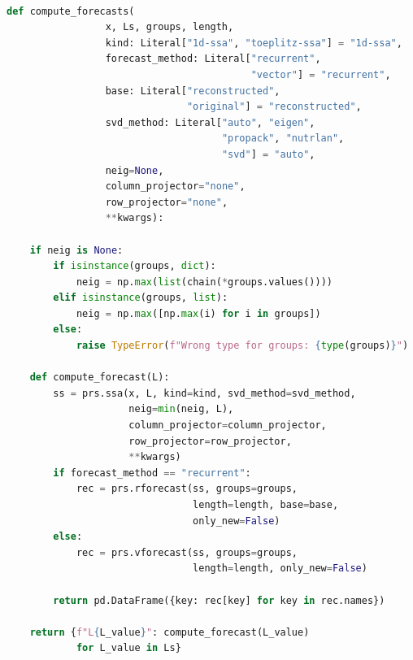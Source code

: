 \documentclass[specialist,
			   substylefile = spbu_report.rtx,
			   subf,href,colorlinks=true, 12pt]{disser}
\begin{document}
\begin{lstlisting}[language=Python, caption=Функции для подсчета значений прогноза временного ряда при тестировании.]

def compute_forecasts(
                 x, Ls, groups, length,
                 kind: Literal["1d-ssa", "toeplitz-ssa"] = "1d-ssa",
                 forecast_method: Literal["recurrent", 
                                          "vector"] = "recurrent",
                 base: Literal["reconstructed", 
                               "original"] = "reconstructed",
                 svd_method: Literal["auto", "eigen", 
                                     "propack", "nutrlan",
                                     "svd"] = "auto",
                 neig=None,
                 column_projector="none",
                 row_projector="none",
                 **kwargs):
                 
    if neig is None:
        if isinstance(groups, dict):
            neig = np.max(list(chain(*groups.values())))
        elif isinstance(groups, list):
            neig = np.max([np.max(i) for i in groups])
        else:
            raise TypeError(f"Wrong type for groups: {type(groups)}")

    def compute_forecast(L):
        ss = prs.ssa(x, L, kind=kind, svd_method=svd_method,
                     neig=min(neig, L),
                     column_projector=column_projector,
                     row_projector=row_projector,
                     **kwargs)
        if forecast_method == "recurrent":
            rec = prs.rforecast(ss, groups=groups,
                                length=length, base=base,
                                only_new=False)
        else:
            rec = prs.vforecast(ss, groups=groups, 
                                length=length, only_new=False)

        return pd.DataFrame({key: rec[key] for key in rec.names})

    return {f"L{L_value}": compute_forecast(L_value)
    	    for L_value in Ls}
	
\end{lstlisting}
\end{document}
